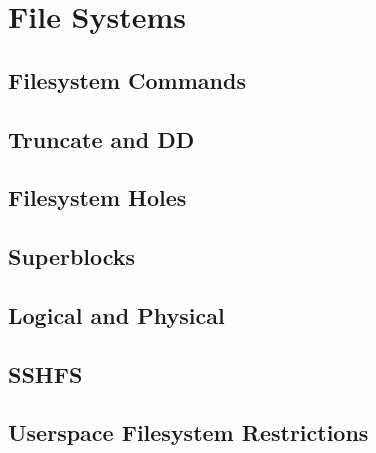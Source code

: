 \section{File Systems}
\subsection{Filesystem Commands}

\subsection{Truncate and DD}

\subsection{Filesystem Holes}

\subsection{Superblocks}

\subsection{Logical and Physical}

\subsection {SSHFS}

\subsection{Userspace Filesystem Restrictions}

